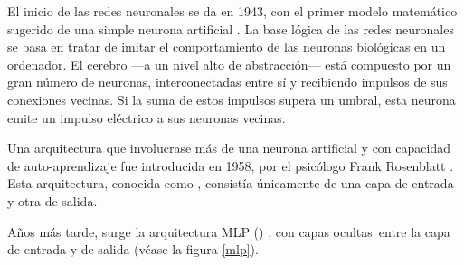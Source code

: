 El inicio de las redes neuronales se da en 1943, con el primer modelo matemático sugerido de una simple neurona artificial \parencite{artneu}. La base lógica de las redes neuronales se basa en tratar de imitar el comportamiento de las neuronas biológicas en un ordenador. El cerebro ---a un nivel alto de abstracción--- está compuesto por un gran número de neuronas, interconectadas entre sí y recibiendo impulsos de sus conexiones vecinas. Si la suma de estos impulsos supera un umbral, esta neurona emite un impulso eléctrico a sus neuronas vecinas.

Una arquitectura que involucrase más de una neurona artificial y con capacidad de auto-aprendizaje fue introducida en 1958, por el psicólogo Frank Rosenblatt \parencite{perceptrón}. Esta arquitectura, conocida como , consistía únicamente de una capa de entrada y otra de salida. 

Años más tarde, surge la arquitectura MLP () \parencite{originsMLP}, con capas ocultas\fnm\ entre la capa de entrada y de salida (véase la figura \ref{mlp}).

\bigskip


